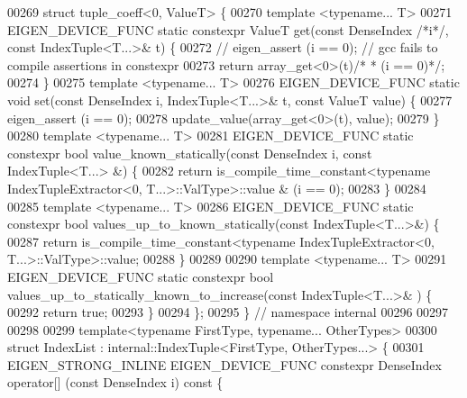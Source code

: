 \begin{DoxyCode}
00269 \textcolor{keyword}{struct }tuple\_coeff<0, ValueT> \{
00270   \textcolor{keyword}{template} <\textcolor{keyword}{typename}... T>
00271   EIGEN\_DEVICE\_FUNC \textcolor{keyword}{static} constexpr ValueT \textcolor{keyword}{get}(\textcolor{keyword}{const} DenseIndex \textcolor{comment}{/*i*/}, \textcolor{keyword}{const} IndexTuple<T...>& t) \{
00272     \textcolor{comment}{//  eigen\_assert (i == 0);  // gcc fails to compile assertions in constexpr}
00273     \textcolor{keywordflow}{return} array\_get<0>(t)\textcolor{comment}{/* * (i == 0)*/};
00274   \}
00275   \textcolor{keyword}{template} <\textcolor{keyword}{typename}... T>
00276   EIGEN\_DEVICE\_FUNC \textcolor{keyword}{static} \textcolor{keywordtype}{void} \textcolor{keyword}{set}(\textcolor{keyword}{const} DenseIndex i, IndexTuple<T...>& t, \textcolor{keyword}{const} ValueT value) \{
00277     eigen\_assert (i == 0);
00278     update\_value(array\_get<0>(t), value);
00279   \}
00280   \textcolor{keyword}{template} <\textcolor{keyword}{typename}... T>
00281   EIGEN\_DEVICE\_FUNC \textcolor{keyword}{static} constexpr \textcolor{keywordtype}{bool} value\_known\_statically(\textcolor{keyword}{const} DenseIndex i, \textcolor{keyword}{const} IndexTuple<T...>
      &) \{
00282     \textcolor{keywordflow}{return} is\_compile\_time\_constant<\textcolor{keyword}{typename} IndexTupleExtractor<0, T...>::ValType>::value & (i == 0);
00283   \}
00284 
00285   \textcolor{keyword}{template} <\textcolor{keyword}{typename}... T>
00286   EIGEN\_DEVICE\_FUNC \textcolor{keyword}{static} constexpr \textcolor{keywordtype}{bool} values\_up\_to\_known\_statically(\textcolor{keyword}{const} IndexTuple<T...>&) \{
00287     \textcolor{keywordflow}{return} is\_compile\_time\_constant<\textcolor{keyword}{typename} IndexTupleExtractor<0, T...>::ValType>::value;
00288   \}
00289 
00290   \textcolor{keyword}{template} <\textcolor{keyword}{typename}... T>
00291   EIGEN\_DEVICE\_FUNC \textcolor{keyword}{static} constexpr \textcolor{keywordtype}{bool} values\_up\_to\_statically\_known\_to\_increase(\textcolor{keyword}{const} IndexTuple<T...>&
      ) \{
00292     \textcolor{keywordflow}{return} \textcolor{keyword}{true};
00293   \}
00294 \};
00295 \}  \textcolor{comment}{// namespace internal}
00296 
00297 
00298 
00299 \textcolor{keyword}{template}<\textcolor{keyword}{typename} FirstType, \textcolor{keyword}{typename}... OtherTypes>
00300 \textcolor{keyword}{struct }IndexList : internal::IndexTuple<FirstType, OtherTypes...> \{
00301   EIGEN\_STRONG\_INLINE EIGEN\_DEVICE\_FUNC constexpr DenseIndex operator[] (\textcolor{keyword}{const} DenseIndex i)\textcolor{keyword}{ const }\{

\end{DoxyCode}
